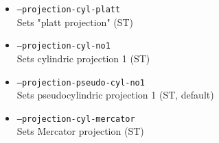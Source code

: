 \begin{itemize}
\item \texttt{--projection-cyl-platt} \\
Sets "platt projection" (ST)

\item \texttt{--projection-cyl-no1} \\
Sets cylindric projection 1 (ST)

\item \texttt{--projection-pseudo-cyl-no1} \\
Sets pseudocylindric projection 1 (ST, default)

\item \texttt{--projection-cyl-mercator} \\
Sets Mercator projection (ST)

\end{itemize}

